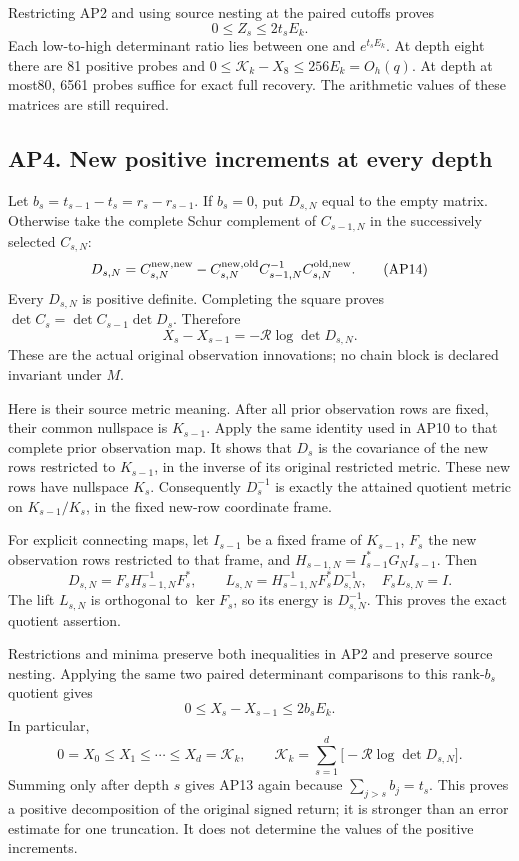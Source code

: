 \documentclass[11pt]{article}
\begin{document}
Restricting AP2 and using source nesting at the paired cutoffs proves \[
 0\le Z_s\le2t_sE_k.
 \tag{AP13}
\] Each low-to-high determinant ratio lies between one and \(e^{t_sE_k}\). At depth eight there are 81 positive probes and \(0\le\mathcal K_k-X_8\le256E_k=O_h(q)\). At depth at most80, 6561 probes suffice for exact full recovery. The arithmetic values of these matrices are still required.

\subsection{AP4. New positive increments at every depth}\label{ap4.-new-positive-increments-at-every-depth}

Let \(b_s=t_{s-1}-t_s=r_s-r_{s-1}\). If \(b_s=0\), put \(D_{s,N}\) equal to the empty matrix. Otherwise take the complete Schur complement of \(C_{s-1,N}\) in the successively selected \(C_{s,N}\): \[
 D_{s,N}=C_{s,N}^{\rm new,new}
 -C_{s,N}^{\rm new,old}C_{s-1,N}^{-1}C_{s,N}^{\rm old,new}.
 \tag{AP14}
\] Every \(D_{s,N}\) is positive definite. Completing the square proves \(\det C_s=\det C_{s-1}\det D_s\). Therefore \[
 X_s-X_{s-1}=-\mathcal R\log\det D_{s,N}. \tag{AP15}
\] These are the actual original observation innovations; no chain block is declared invariant under \(M\).

Here is their source metric meaning. After all prior observation rows are fixed, their common nullspace is \(K_{s-1}\). Apply the same identity used in AP10 to that complete prior observation map. It shows that \(D_s\) is the covariance of the new rows restricted to \(K_{s-1}\), in the inverse of its original restricted metric. These new rows have nullspace \(K_s\). Consequently \(D_s^{-1}\) is exactly the attained quotient metric on \(K_{s-1}/K_s\), in the fixed new-row coordinate frame.

For explicit connecting maps, let \(I_{s-1}\) be a fixed frame of \(K_{s-1}\), \(F_s\) the new observation rows restricted to that frame, and \(H_{s-1,N}=I_{s-1}^*G_NI_{s-1}\). Then \[
 D_{s,N}=F_sH_{s-1,N}^{-1}F_s^*,\qquad
 L_{s,N}=H_{s-1,N}^{-1}F_s^*D_{s,N}^{-1},\quad F_sL_{s,N}=I.
 \tag{AP16}
\] The lift \(L_{s,N}\) is orthogonal to \(\ker F_s\), so its energy is \(D_{s,N}^{-1}\). This proves the exact quotient assertion.

Restrictions and minima preserve both inequalities in AP2 and preserve source nesting. Applying the same two paired determinant comparisons to this rank-\(b_s\) quotient gives \[
 0\le X_s-X_{s-1}\le2b_sE_k. \tag{AP17}
\] In particular, \[
 0=X_0\le X_1\le\cdots\le X_d=\mathcal K_k,\qquad
 \mathcal K_k=\sum_{s=1}^d\bigl[-\mathcal R\log\det D_{s,N}\bigr].
 \tag{AP18}
\] Summing only after depth \(s\) gives AP13 again because \(\sum_{j>s}b_j=t_s\). This proves a positive decomposition of the original signed return; it is stronger than an error estimate for one truncation. It does not determine the values of the positive increments.
\end{document}
